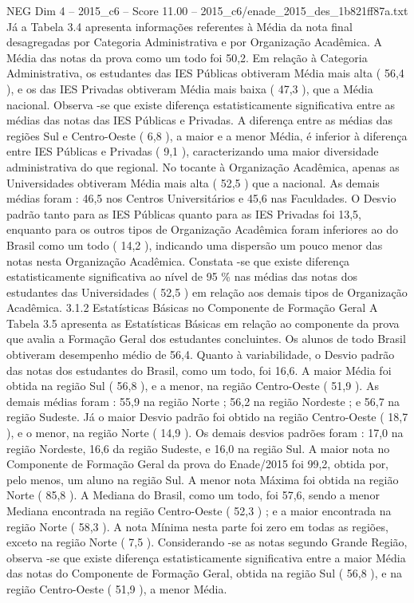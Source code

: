 \begin{textsample}{NEG Dim 4 – 2015\_c6 – Score 11.00 – 2015\_c6/enade\_2015\_des\_1b821ff87a.txt}
Já a Tabela 3.4 apresenta informações referentes à Média da nota final desagregadas por Categoria Administrativa e por Organização Acadêmica.
A Média das notas da prova como um todo foi 50,2.
Em relação à Categoria Administrativa, os estudantes das IES Públicas obtiveram Média mais alta ( 56,4 ), e os das IES Privadas obtiveram Média mais baixa ( 47,3 ), que a Média nacional.
Observa -se que existe diferença estatisticamente significativa entre as médias das notas das IES Públicas e Privadas.
A diferença entre as médias das regiões Sul e Centro-Oeste ( 6,8 ), a maior e a menor Média, é inferior à diferença entre IES Públicas e Privadas ( 9,1 ), caracterizando uma maior diversidade administrativa do que regional.
No tocante à Organização Acadêmica, apenas as Universidades obtiveram Média mais alta ( 52,5 ) que a nacional.
As demais médias foram : 46,5 nos Centros Universitários e 45,6 nas Faculdades.
O Desvio padrão tanto para as IES Públicas quanto para as IES Privadas foi 13,5, enquanto para os outros tipos de Organização Acadêmica foram inferiores ao do Brasil como um todo ( 14,2 ), indicando uma dispersão um pouco menor das notas nesta Organização Acadêmica.
Constata -se que existe diferença estatisticamente significativa ao nível de 95 \% nas médias das notas dos estudantes das Universidades ( 52,5 ) em relação aos demais tipos de Organização Acadêmica. 3.1.2 Estatísticas Básicas no Componente de Formação Geral A Tabela 3.5 apresenta as Estatísticas Básicas em relação ao componente da prova que avalia a Formação Geral dos estudantes concluintes.
Os alunos de todo Brasil obtiveram desempenho médio de 56,4.
Quanto à variabilidade, o Desvio padrão das notas dos estudantes do Brasil, como um todo, foi 16,6.
A maior Média foi obtida na região Sul ( 56,8 ), e a menor, na região Centro-Oeste ( 51,9 ).
As demais médias foram : 55,9 na região Norte ; 56,2 na região Nordeste ; e 56,7 na região Sudeste.
Já o maior Desvio padrão foi obtido na região Centro-Oeste ( 18,7 ), e o menor, na região Norte ( 14,9 ).
Os demais desvios padrões foram : 17,0 na região Nordeste, 16,6 da região Sudeste, e 16,0 na região Sul.
A maior nota no Componente de Formação Geral da prova do Enade/2015 foi 99,2, obtida por, pelo menos, um aluno na região Sul.
A menor nota Máxima foi obtida na região Norte ( 85,8 ).
A Mediana do Brasil, como um todo, foi 57,6, sendo a menor Mediana encontrada na região Centro-Oeste ( 52,3 ) ; e a maior encontrada na região Norte ( 58,3 ).
A nota Mínima nesta parte foi zero em todas as regiões, exceto na região Norte ( 7,5 ).
Considerando -se as notas segundo Grande Região, observa -se que existe diferença estatisticamente significativa entre a maior Média das notas do Componente de Formação Geral, obtida na região Sul ( 56,8 ), e na região Centro-Oeste ( 51,9 ), a menor Média.

\end{textsample}
